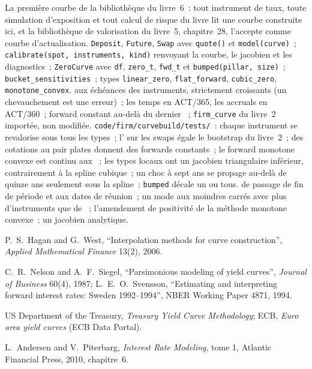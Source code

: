 \begin{build}
 La première courbe de la bibliothèque du livre~6~: tout instrument de taux,
toute simulation d'exposition et tout calcul de risque du livre lit une courbe construite ici, et la
bibliothèque de valorisation du livre~5, chapitre~28, l'accepte comme
courbe d'actualisation.
 \texttt{Deposit}, \texttt{Future}, \texttt{Swap} avec
\texttt{quote()} et \texttt{model(curve)}~; \texttt{calibrate(spot, instruments,
kind)} renvoyant la courbe, le jacobien et les diagnostics~; \texttt{ZeroCurve}
avec \texttt{df}, \texttt{zero\_t}, \texttt{fwd\_t} et \texttt{bumped(pillar,
size)}~; \texttt{bucket\_sensitivities}~; types \texttt{linear\_zero},
\texttt{flat\_forward}, \texttt{cubic\_zero}, \texttt{monotone\_convex}.
  aux échéances des instruments, strictement croissants (un
chevauchement est une erreur)~; les temps en ACT/365, les accruals en ACT/360~; forward constant au-delà du
dernier ~; \texttt{firm\_curve} du livre~2 importée, non modifiée.
 \texttt{code/firm/curvebuild/tests/}~: chaque
instrument se revalorise sous tous les types~; l' sur les swaps égale le
bootstrap du livre~2~; des cotations au pair plates donnent des forwards constants~; le forward monotone convexe est
continu aux ~; les types locaux ont un jacobien triangulaire inférieur, contrairement à la
spline cubique~; un choc à sept ans se propage au-delà de quinze ans seulement sous la
spline~; \texttt{bumped} décale un  ou tous.
  de passage de fin de période et  aux dates de réunion~; un mode aux moindres carrés avec plus
d'instruments que de ~; l'amendement de positivité de la
méthode monotone convexe~; un jacobien analytique.
\end{build}

\begin{omsources}
\item P.\ S.\ Hagan and G.\ West, ``Interpolation methods for curve
construction'', \emph{Applied Mathematical Finance} 13(2), 2006.
\item C.\ R.\ Nelson and A.\ F.\ Siegel, ``Parsimonious modeling of yield
curves'', \emph{Journal of Business} 60(4), 1987; L.\ E.\ O.\ Svensson,
``Estimating and interpreting forward interest rates: Sweden 1992--1994'', NBER
Working Paper 4871, 1994.
\item US Department of the Treasury, \emph{Treasury Yield Curve Methodology};
ECB, \emph{Euro area yield curves} (ECB Data Portal).
\item L.\ Andersen and V.\ Piterbarg, \emph{Interest Rate Modeling}, tome 1,
Atlantic Financial Press, 2010, chapitre~6.
\end{omsources}

